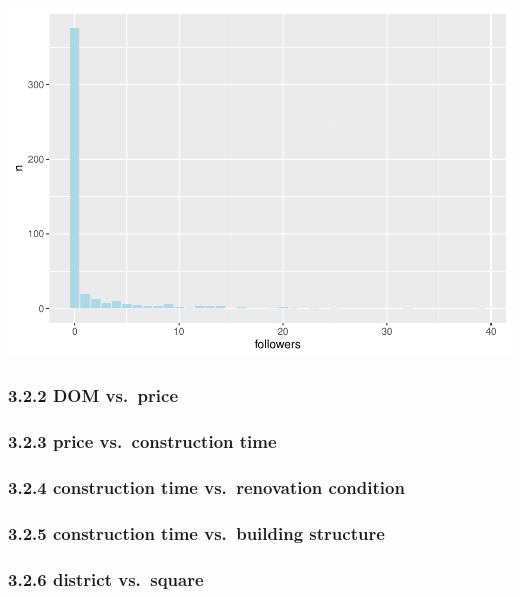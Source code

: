 \documentclass[
]{article}
\begin{document}
\includegraphics{Project_files/figure-latex/unnamed-chunk-39-1.pdf}

\hypertarget{dom-vs.-price}{%
\subsubsection{3.2.2 DOM vs.~price}\label{dom-vs.-price}}

\hypertarget{price-vs.-construction-time}{%
\subsubsection{3.2.3 price vs.~construction
time}\label{price-vs.-construction-time}}

\hypertarget{construction-time-vs.-renovation-condition}{%
\subsubsection{3.2.4 construction time vs.~renovation
condition}\label{construction-time-vs.-renovation-condition}}

\hypertarget{construction-time-vs.-building-structure}{%
\subsubsection{3.2.5 construction time vs.~building
structure}\label{construction-time-vs.-building-structure}}

\hypertarget{district-vs.-square}{%
\subsubsection{3.2.6 district vs.~square}\label{district-vs.-square}}
\end{document}
